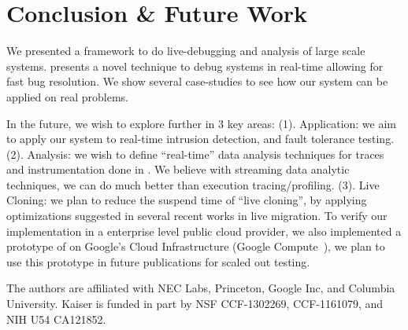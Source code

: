 \section{Conclusion \& Future Work}
\label{sec:conclusion}


We presented \parikshan a framework to do live-debugging and analysis of large scale systems.
\parikshan presents a novel technique to debug systems in real-time allowing for fast bug resolution.
We show several case-studies to see how our system can be applied on real problems. 


In the future, we wish to explore \parikshan further in 3 key areas: (1). Application: we aim to apply our system to real-time intrusion detection, and fault tolerance testing.
(2). Analysis: we wish to define ``real-time'' data analysis techniques for traces and instrumentation done in \parikshan.
We believe with streaming data analytic techniques, we can do much better than execution tracing/profiling.
(3). Live Cloning: we plan to reduce the suspend time of ``live cloning'', by applying optimizations suggested in several recent works in live migration.
To verify our implementation in a enterprise level public cloud provider, we also implemented a prototype of \parikshan on Google's Cloud Infrastructure (Google Compute~\cite{gcompute}), we plan to use this prototype in future publications for scaled out testing. 


The authors are affiliated with NEC Labs, Princeton, Google Inc, and Columbia University. 
Kaiser is funded in part by NSF CCF-1302269, CCF-1161079, and NIH U54 CA121852.
